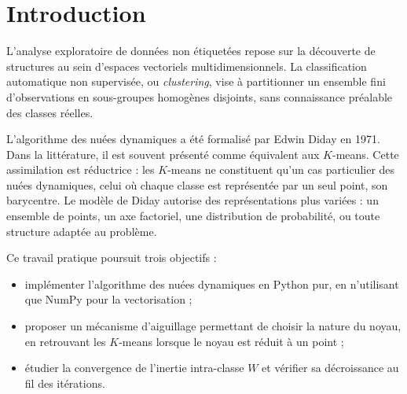 \documentclass[a4paper, 11pt]{article}
\begin{document}
	
	\newpage
	\begin{abstract}
		Ce rapport présente l'implémentation de l'algorithme des nuées
		dynamiques, formalisé par Edwin Diday en 1971. Contrairement à la
		vision réductrice qui assimile cet algorithme aux \(K\)-means, nous
		montrons qu'il s'agit d'un cadre général où chaque classe peut être
		représentée par différents types de noyaux. Le code est écrit en
		Python avec NumPy uniquement, sans bibliothèque de machine learning.
		Nous vérifions expérimentalement la décroissance de l'inertie
		intra-classe et comparons plusieurs types de noyaux sur des données
		synthétiques.
	\end{abstract}
	
	\newpage
	\tableofcontents
	\newpage
	
	\section*{Introduction}
	
	L'analyse exploratoire de données non étiquetées repose sur la
	découverte de structures au sein d'espaces vectoriels
	multidimensionnels. La classification automatique non supervisée, ou
	\emph{clustering}, vise à partitionner un ensemble fini
	d'observations en sous-groupes homogènes disjoints, sans connaissance
	préalable des classes réelles.
	
	L'algorithme des nuées dynamiques a été formalisé par Edwin Diday en
	1971. Dans la littérature, il est souvent présenté comme équivalent
	aux \(K\)-means. Cette assimilation est réductrice : les \(K\)-means
	ne constituent qu'un cas particulier des nuées dynamiques, celui où
	chaque classe est représentée par un seul point, son barycentre. Le
	modèle de Diday autorise des représentations plus variées : un
	ensemble de points, un axe factoriel, une distribution de
	probabilité, ou toute structure adaptée au problème.
	
	Ce travail pratique poursuit trois objectifs :
	\begin{itemize}
		\item implémenter l'algorithme des nuées dynamiques en Python
		pur, en n'utilisant que NumPy pour la vectorisation ;
		\item proposer un mécanisme d'aiguillage permettant de choisir la
		nature du noyau, en retrouvant les \(K\)-means lorsque le
		noyau est réduit à un point ;
		\item étudier la convergence de l'inertie intra-classe \(W\) et
		vérifier sa décroissance au fil des itérations.
	\end{itemize}
	
\end{document}
